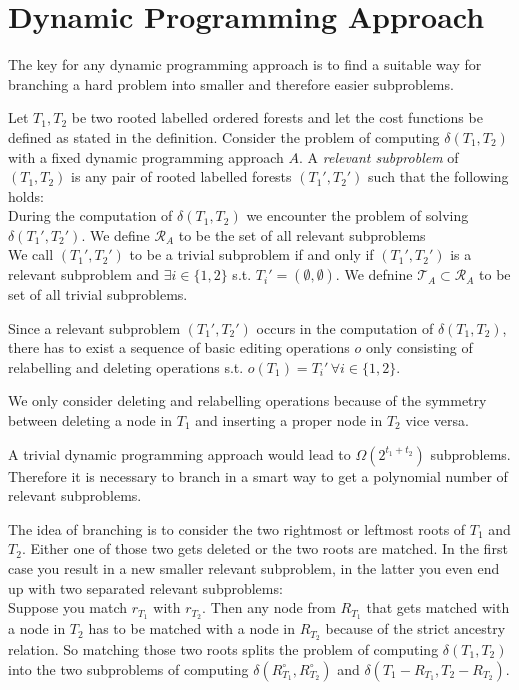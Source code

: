 \section{Dynamic Programming Approach}
The key for any dynamic programming approach is to find a suitable way for branching a hard problem into smaller and therefore easier subproblems. 
\begin{defin}
Let $T_1,T_2$ be two rooted labelled ordered forests and let the cost functions be defined as stated in the definition.
Consider the problem of computing $\delta(T_1,T_2)$ with a fixed dynamic programming approach $A$. A \textit{relevant subproblem} of $(T_1,T_2)$ is any pair of rooted labelled forests $(T_1',T_2')$ such that the following holds:\\
During the computation of $\delta(T_1,T_2)$ we encounter the problem of solving $\delta(T_1',T_2')$. We define $\mathcal{R}_A$ to be the set of all relevant subproblems\\
We call $(T_1',T_2')$ to be a trivial subproblem if and only if $(T_1',T_2')$ is a relevant subproblem and $\exists i \in \{1,2\}$ s.t. $T_i' = (\emptyset,\emptyset)$. We defnine $\mathcal{T}_A \subset \mathcal{R}_A$ to be set of all trivial subproblems.
\end{defin}
\begin{rem}
Since a relevant subproblem $(T_1',T_2')$ occurs in the computation of $\delta(T_1,T_2)$, there has to exist a sequence of basic editing operations $o$ only consisting of relabelling and deleting operations s.t. $o(T_1)=T_i' \, \forall i \in \{1,2\}$.
\end{rem}
\begin{rem}
We only consider deleting and relabelling operations because of the symmetry between deleting a node in $T_1$ and inserting a proper node in $T_2$ vice versa.
\end{rem}
\begin{rem}
A trivial dynamic programming approach would lead to $\Omega(2^{t_1+t_2})$ subproblems. Therefore it is necessary to branch in a smart way to get a polynomial number of relevant subproblems.
\end{rem}
The idea of branching is to consider the two rightmost or leftmost roots of $T_1$ and $T_2$. Either one of those two gets deleted or the two roots are matched. In the first case you result in a new smaller relevant subproblem, in the latter you even end up with two separated relevant subproblems:\\
Suppose you match $r_{T_1}$ with  $r_{T_2}$. Then any node from $R_{T_1}$ that gets matched with a node in $T_2$ has to be matched with a node in $R_{T_2}$ because of the strict ancestry relation. So matching those two roots splits the problem of computing $\delta(T_1,T_2)$ into the two subproblems of computing $\delta(R_{T_1}^{\circ},R_{T_2}^{\circ})$ and $\delta(T_1-R_{T_1},T_2-R_{T_2})$.
